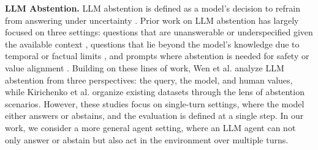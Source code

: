 \documentclass{article}
\begin{document}
\textbf{LLM Abstention.} LLM abstention is defined as a model’s decision to refrain from answering under uncertainty \cite{wen2025know, kirichenko2025abstentionbench, wen2025marvel, wen2024characterizing}. Prior work on LLM abstention has largely focused on three settings: questions that are unanswerable or underspecified given the available context \cite{cao2026clarify, kwiatkowski2019natural, trivedi2022musique, reddy2019coqa, choi2018quac, min2020ambigqa, zhang2021situatedqa, yin2023large, amayuelas2024knowledge,jin2019pubmedqa, dasigi2021dataset}, questions that lie beyond the model’s knowledge due to temporal or factual limits \cite{kasai2023realtime, yang2024alignment, feng2024don, mallen2023not, sciavolino2021simple}, and prompts where abstention is needed for safety or value alignment \cite{han2024wildguard, gehman2020realtoxicityprompts, hartvigsen2022toxigen, elsherief2021latent, lin2023toxicchat, ji2023beavertails, xu2023cvalues, rottger2024xstest, qiu2023latent, shen2024anything, wang2024not, wang2023all, li2024salad, xie2024sorry}. Building on these lines of work, Wen et al. \cite{wen2025know} analyze LLM abstention from three perspectives: the query, the model, and human values, while Kirichenko et al. \cite{kirichenko2025abstentionbench} organize existing datasets through the lens of abstention scenarios. However, these studies focus on single-turn settings, where the model either answers or abstains, and the evaluation is defined at a single step. In our work, we consider a more general agent setting, where an LLM agent can not only answer or abstain but also act in the environment over multiple turns.
\end{document}
